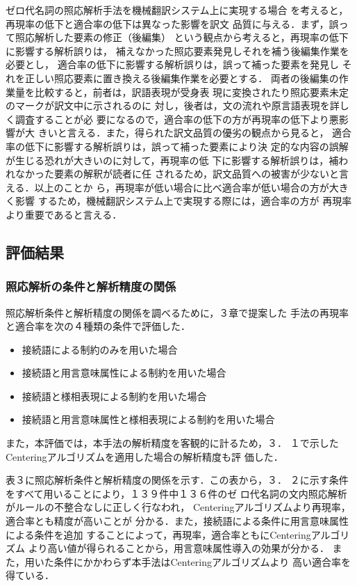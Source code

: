 ゼロ代名詞の照応解析手法を機械翻訳システム上に実現する場合
を考えると，再現率の低下と適合率の低下は異なった影響を訳文
品質に与える．まず，誤って照応解析した要素の修正（後編集）
という観点から考えると，再現率の低下に影響する解析誤りは，
補えなかった照応要素発見しそれを補う後編集作業を必要とし，
適合率の低下に影響する解析誤りは，誤って補った要素を発見し
それを正しい照応要素に置き換える後編集作業を必要とする．
両者の後編集の作業量を比較すると，前者は，訳語表現が受身表
現に変換されたり照応要素未定のマークが訳文中に示されるのに
対し，後者は，文の流れや原言語表現を詳しく調査することが必
要になるので，適合率の低下の方が再現率の低下より悪影響が大
きいと言える．また，得られた訳文品質の優劣の観点から見ると，
適合率の低下に影響する解析誤りは，誤って補った要素により決
定的な内容の誤解が生じる恐れが大きいのに対して，再現率の低
下に影響する解析誤りは，補われなかった要素の解釈が読者に任
されるため，訳文品質への被害が少ないと言える．以上のことか
ら，再現率が低い場合に比べ適合率が低い場合の方が大きく影響
するため，機械翻訳システム上で実現する際には，適合率の方が
再現率より重要であると言える．

\subsection{評価結果}
\subsubsection{照応解析の条件と解析精度の関係}

照応解析条件と解析精度の関係を調べるために，３章で提案した
手法の再現率と適合率を次の４種類の条件で評価した．

\begin{itemize}
\item 接続語による制約のみを用いた場合
\item 接続語と用言意味属性による制約を用いた場合
\item 接続語と様相表現による制約を用いた場合
\item 接続語と用言意味属性と様相表現による制約を用いた場合
\end{itemize}

また，本評価では，本手法の解析精度を客観的に計るため，３．
１で示したCenteringアルゴリズムを適用した場合の解析精度も評
価した．

表３に照応解析条件と解析精度の関係を示す．この表から，３．
２に示す条件をすべて用いることにより，１３９件中１３６件のゼ
ロ代名詞の文内照応解析がルールの不整合なしに正しく行なわれ，
Centeringアルゴリズムより再現率，適合率とも精度が高いことが
分かる．また，接続語による条件に用言意味属性による条件を追加
することによって，再現率，適合率ともにCenteringアルゴリズム
より高い値が得られることから，用言意味属性導入の効果が分かる．
また，用いた条件にかかわらず本手法はCenteringアルゴリズムより
高い適合率を得ている．

